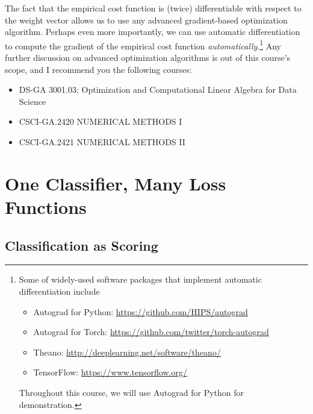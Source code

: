 \documentclass{report}
\newcommand{\vect}[1]{\mathbf{#1}}
\newcommand{\vx}[0]{\vect{x}}
\newcommand{\vw}[0]{\vect{w}}
\begin{document}
The fact that the empirical cost function is (twice) differentiable with respect
to the weight vector allows us to use any advanced gradient-based optimization
algorithm. Perhaps even more importantly, we can use automatic differentiation
to compute the gradient of the empirical cost function {\it
automatically}.\footnote{
    Some of widely-used software packages that implement automatic
    differentiation include
    \begin{itemize}
        \item Autograd for Python: \url{https://github.com/HIPS/autograd}
        \item Autograd for Torch:
            \url{https://github.com/twitter/torch-autograd}
        \item Theano: \url{http://deeplearning.net/software/theano/}
        \item TensorFlow: \url{https://www.tensorflow.org/}
    \end{itemize}
    Throughout this course, we will use Autograd for Python for demonstration.
}
Any further discussion on advanced optimization algorithms is out of this
course's scope, and I recommend you the following courses:
\begin{itemize}
    \item DS-GA 3001.03: Optimization and Computational Linear Algebra for Data
        Science
    \item CSCI-GA.2420 NUMERICAL METHODS I
    \item CSCI-GA.2421 NUMERICAL METHODS II
\end{itemize}


\section{One Classifier, Many Loss Functions}

\subsection{Classification as Scoring}

\end{document}
